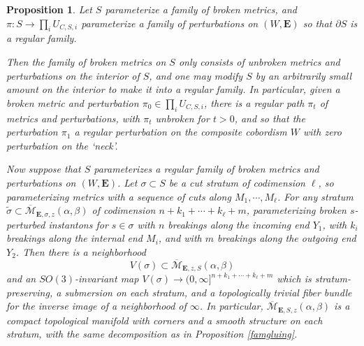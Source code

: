 \documentclass[10pt,a4paper]{amsart}
\newtheorem{proposition}[theorem]{Proposition}
\theoremstyle{definition}
\theoremstyle{remark}
\numberwithin{figure}{qchap}
\begin{document}
\begin{proposition}\label{famcut}Let $S$ parameterize a family of broken metrics, and $\pi: S \to \prod_i U_{C,S,i}$ parameterize a family of perturbations on $(W,\mathbf{E})$ so that $\partial S$ is a regular family.

Then the family of broken metrics on $S$ only consists of unbroken metrics and perturbations on the interior of $S$, and one may modify $S$ by an arbitrarily small amount on the interior to make it into a regular family. In particular, given a broken metric and perturbation $\pi_0 \in \prod_i U_{C,S,i}$, there is a regular path $\pi_t$ of metrics and perturbations, with $\pi_t$ unbroken for $t > 0$, and so that the perturbation $\pi_1$ a regular perturbation on the composite cobordism $W$ with zero perturbation on the `neck'.

Now suppose that $S$ parameterizes a regular family of broken metrics and perturbations on $(W,\mathbf{E})$. Let $\sigma \subset S$ be a cut stratum of codimension $\ell$, so parameterizing metrics with a sequence of cuts along $M_1, \cdots, M_\ell$. For any stratum $\widetilde \sigma \subset \overline{\mathcal M}_{\mathbf{E},\sigma,z}(\alpha, \beta)$ of codimension $n + k_1 + \cdots + k_\ell + m$, parameterizing broken $s$-perturbed instantons for $s \in \sigma$ with $n$ breakings along the incoming end $Y_1$, with $k_i$ breakings along the internal end $M_i$, and with $m$ breakings along the outgoing end $Y_2$. Then there is a neighborhood $$V(\sigma) \subset \overline{\mathcal M}_{\mathbf{E},z,S}(\alpha, \beta)$$ and an $SO(3)$-invariant map $V(\sigma) \to (0,\infty]^{n+k_1 + \cdots + k_\ell +m}$ which is stratum-preserving, a submersion on each stratum, and a topologically trivial fiber bundle for the inverse image of a neighborhood of $\infty$. In particular, $\overline{\mathcal M}_{\mathbf{E},S,z}(\alpha, \beta)$ is a compact topological manifold with corners and a smooth structure on each stratum, with the same decomposition as in Proposition \ref{famgluing}.
\end{proposition}
\end{document}
